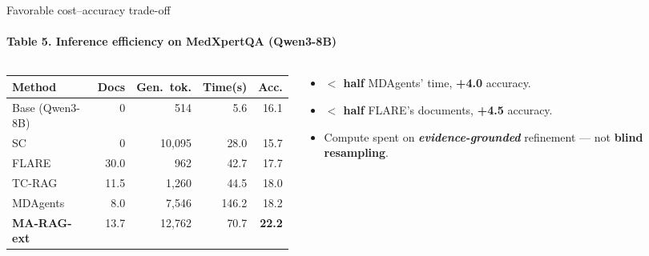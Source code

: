 \documentclass[10pt, aspectratio=169, t]{beamer}   %
\newcommand{\good}[1]{{\color{posblue}\bfseries #1}}  %
\newcommand{\warn}[1]{{\color{negmag}\bfseries #1}}   %
\newcommand{\blue}{\color{posblue}\bfseries}  %
\begin{document}
\begin{frame}{Favorable cost--accuracy trade-off}
  \framesubtitle{Table 5. Inference efficiency on MedXpertQA (Qwen3-8B)}
  \vfill
  \begin{columns}[c]
    \begin{column}{0.56\textwidth}
      \centering
      \scriptsize
      \renewcommand{\arraystretch}{1.3}
      \setlength{\tabcolsep}{5pt}
      \begin{tabular}{l rrr r}
        \toprule
        \textbf{Method} & Docs & Gen.\ tok. & Time(s) & Acc.\\
        \midrule
        Base (Qwen3-8B) & 0    & 514    & 5.6   & 16.1\\
        SC              & 0    & 10{,}095 & 28.0  & 15.7\\
        FLARE           & 30.0 & 962    & 42.7  & 17.7\\
        TC-RAG          & 11.5 & 1{,}260  & 44.5  & 18.0\\
        MDAgents        & 8.0  & 7{,}546  & 146.2 & 18.2\\
        \rowcolor{accent!12}
        \textbf{MA-RAG-ext} & 13.7 & 12{,}762 & 70.7 & \textbf{22.2}\\
        \bottomrule
      \end{tabular}
    \end{column}
    \begin{column}{0.44\textwidth}
      \begin{itemize}\setlength{\itemsep}{16pt}
        \item \textbf{$<$ half} MDAgents' time, {\blue +4.0} accuracy.
        \item \textbf{$<$ half} FLARE's documents, {\blue +4.5} accuracy.
        \item Compute spent on \good{\emph{evidence-grounded}} refinement — not \warn{blind resampling}.
      \end{itemize}
    \end{column}
  \end{columns}
  \vfill
\end{frame}
\end{document}

